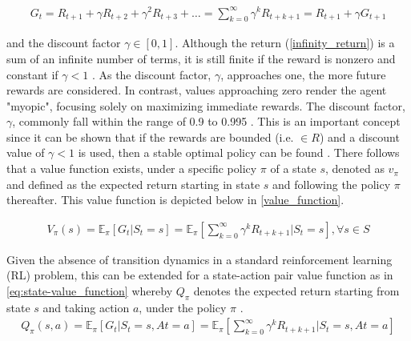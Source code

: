 \begin{equation} \label{eq:total-return}
	\begin{aligned}
		G_t  = R_{t+1} + \gamma R_{t+2} + \gamma^2 R_{t+3} + \dots = \sum_{k=0}^\infty \gamma^k R_{t+k+1} = R_{t+1} + \gamma G_{t+1}
	\end{aligned}
\end{equation}

and the discount factor $\gamma \in [0,1]$. Although the return (\autoref{infinity_return}) is a sum of an infinite number of terms, it is still finite if the reward is nonzero and constant if $\gamma < 1$ \cite{suttonReinforcementLearningIntroduction2014}. As the discount factor, $\gamma$, approaches one, the more future rewards are considered.  In contrast, values approaching zero render the agent "myopic", focusing solely on maximizing immediate rewards. The discount factor, $\gamma$, commonly fall within the range of 0.9 to 0.995 \cite{vandenbemdRobustDeepReinforcement}. This is an important concept since it can be shown that if the rewards are bounded (i.e. $\in R$) and a discount value of $\gamma <1$ is used, then a stable optimal policy can be found \cite{bertsekasNewtonMethodReinforcement2022}. There follows that a value function exists, under a specific policy $\pi$ of a state $s$, denoted as $v_{\pi}$ and defined as the expected return starting in state $s$ and following the policy $\pi$ thereafter. This value function is depicted below in \autoref{value_function}.

\begin{equation}
	\begin{aligned}
		V_{\pi}(s) =  \mathbb{E}_{\pi}\left[{G_t | S_t = s}\right] =  \mathbb{E}_{\pi} 
		\left [\sum_{k=0}^{\infty} \gamma^k R_{t+k+1} | S_t = s \right], \forall s \in S 
	\end{aligned}
	\label{value_function}
\end{equation}

Given the absence of transition dynamics in a standard reinforcement learning (RL) problem, this can be extended for a state-action pair value function as in \autoref{eq:state-value_function} whereby $Q_{\pi}$ denotes the expected return starting from state $s$ and taking action $a$, under the policy $\pi$ \cite{ajagekarDeepReinforcementLearning2022}.
\begin{equation}
	\begin{aligned}
		Q_{\pi}(s,a) =  \mathbb{E}_{\pi}\left[{G_t | S_t = s, At = a}\right] =  \mathbb{E}_{\pi}\left[\sum_{k=0}^{\infty} \gamma^k R_{t+k+1} | S_t = s, At = a\right]
	\end{aligned}
	\label{eq:state-value_function}
\end{equation}

